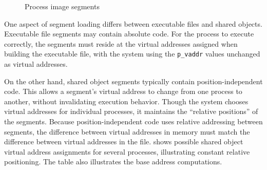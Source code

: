 \documentclass[USenglish,fontsize=11pt,twoside,%
  toc=bib,toc=idx,toc=graduated,numbers=noendperiod,
  bookmarks=true,
  bookmarksnumbered=true,
  bookmarksopen=true,
  bookmarksopenlevel=1,
  breaklinks=true,
  colorlinks=true,
  linkcolor=black,
  pdfpagelayout={TwoPageRight},
  pdfusetitle=true
]{scrreprt}
\begin{document}
\begin{figure}
  \fi
\caption{Process image segments}
\label{fig:pimgseg}
\end{figure}

One aspect of segment loading differs between executable files and
shared objects.  Executable file segments may contain absolute code.
For the process to execute correctly, the segments must reside at the
virtual addresses assigned when building the executable file, with the
system using the \texttt{p\_vaddr} values unchanged as virtual
addresses.

On the other hand, shared object segments typically contain
position-independent code.  This allows a segment's virtual address to
change from one process to another, without invalidating execution
behavior.  Though the system chooses virtual addresses for individual
processes, it maintains the ``relative positions'' of the
segments.  Because position-independent code uses relative addressing
between segments, the difference between virtual addresses in memory
must match the difference between virtual addresses in the
file.   shows possible shared object virtual
address assignments for several processes, illustrating constant
relative positioning.  The table also illustrates the base address
computations.
\end{document}
